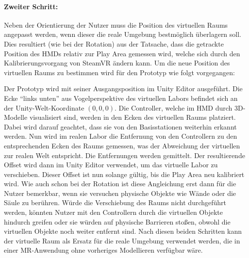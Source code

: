 \paragraph{Zweiter Schritt:}
Neben der Orientierung der Nutzer muss die Position des virtuellen Raums angepasst werden, wenn dieser die reale Umgebung bestmöglich überlagern soll.
Dies resultiert (wie bei der Rotation) aus der Tatsache, dass die getrackte Position des HMDs relativ zur Play Area gemessen wird, welche sich durch den Kalibrierungsvorgang von SteamVR ändern kann.
Um die neue Position des virtuellen Raums zu bestimmen wird für den Prototyp wie folgt vorgegangen:

Der Prototyp wird mit seiner Ausgangsposition im Unity Editor ausgeführt.
Die Ecke \enquote{links unten} aus Vogelperspektive des virtuellen Labors befindet sich an der Unity-Welt-Koordinate $(0, 0, 0)$.
Die Controller, welche im HMD durch 3D-Modelle visualisiert sind, werden in den Ecken des virtuellen Raums platziert.
Dabei wird darauf geachtet, dass sie von den Basisstationen weiterhin erkannt werden.
Nun wird im realen Labor die Entfernung von den Controllern zu den entsprechenden Ecken des Raums gemessen, was der Abweichung der virtuellen zur realen Welt entspricht.
Die Entfernungen werden gemittelt.
Der resultierende Offset wird dann im Unity Editor verwendet, um das virtuelle Labor zu verschieben.
Dieser Offset ist nun solange gültig, bis die Play Area neu kalibriert wird.
Wie auch schon bei der Rotation ist diese Angleichung erst dann für die Nutzer bemerkbar, wenn sie versuchen physische Objekte wie Wände oder die Säule zu berühren.
Würde die Verschiebung des Raums nicht durchgeführt werden, könnten Nutzer mit den Controllern durch die virtuellen Objekte hindurch greifen oder sie würden auf physische Barrieren stoßen, obwohl die virtuellen Objekte noch weiter entfernt sind.
Nach diesen beiden Schritten kann der virtuelle Raum als Ersatz für die reale Umgebung verwendet werden, die in einer MR-Anwendung ohne vorheriges Modellieren verfügbar wäre.

